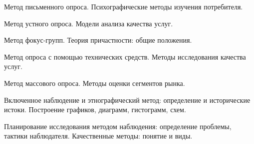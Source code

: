 \documentclass[
	14pt,
	a4paper,
	]
	{scrartcl}
\begin{document}
\vfill

\newpage


\shapk
{}
\setcounter{zad}{0}

\vfill
\z Метод письменного опроса.
 \vfill
\z Психографические методы изучения потребителя.
 \vfill

\vfill

\newpage


\shapk
{}
\setcounter{zad}{0}

\vfill
\z Метод устного опроса.
 \vfill
\z Модели анализа качества услуг.
 \vfill

\vfill

\newpage


\shapk
{}
\setcounter{zad}{0}

\vfill
\z Метод фокус-групп.
 \vfill
\z Теория причастности: общие положения.
 \vfill

\vfill

\newpage


\shapk
{}
\setcounter{zad}{0}

\vfill
\z Метод опроса с помощью технических средств.
 \vfill
\z Методы исследования качества услуг.
 \vfill

\vfill

\newpage


\shapk
{}
\setcounter{zad}{0}

\vfill
\z Метод массового опроса.
 \vfill
\z Методы оценки сегментов рынка.
 \vfill

\vfill

\newpage


\shapk
{}
\setcounter{zad}{0}

\vfill
\z Включенное наблюдение и этнографический метод: определение и исторические истоки.
 \vfill
\z Построение графиков, диаграмм, гистограмм, схем.
 \vfill

\vfill

\newpage


\shapk
{}
\setcounter{zad}{0}

\vfill
\z Планирование исследования методом наблюдения: определение проблемы, тактики наблюдателя.
 \vfill
\z Качественные методы: понятие и виды.
 \vfill

\vfill

\newpage


\shapk
{}
\setcounter{zad}{0}
\end{document}

